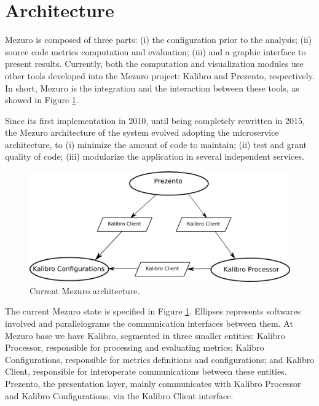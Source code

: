 \section{Architecture}
\label{sec:architecture}

Mezuro is composed of three parts:
(i) the configuration prior to the analysis;
(ii) source code metrics computation and evaluation;
(iii) and a graphic interface to present results.
%
Currently, both the computation and visualization modules use other tools
developed into the Mezuro project: Kalibro and Prezento, respectively. In
short, Mezuro is the integration and the interaction between these tools, as
showed in Figure \ref{fig:architecture-2}.

Since its first implementation in 2010\cite{mezuro2012}, until being completely
rewritten in 2015, the Mezuro architecture of the system evolved adopting the
microservice architecture\cite{namiot2014micro}, to (i) minimize the amount of
code to maintain; (ii) test and grant quality of code; (iii) modularize the
application in several independent services.

\begin{figure}[hbt]
  \centering
    \includegraphics[width=.8\linewidth]{images/mezuro-architecturev3.png}
  \caption{Current Mezuro architecture.}
  \label{fig:architecture-2}
\end{figure}

The current Mezuro state is specified in Figure \ref{fig:architecture-2}.
Ellipses represents softwares involved and parallelograms the communication
interfaces between them. At Mezuro base we have Kalibro, segmented in three
smaller entities: Kalibro Processor, responsible for processing and evaluating
metrics; Kalibro Configurations, responsible for metrics definitions and
configurations; and Kalibro Client, responsible for interoperate communications
between these entities.  Prezento, the presentation layer, mainly communicates
with Kalibro Processor and Kalibro Configurations, via the Kalibro Client
interface.
